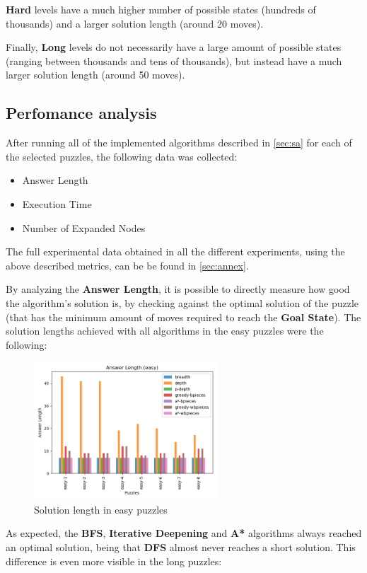 \documentclass[conference]{IEEEtran}
\begin{document}
\textbf{Hard} levels have a much higher number of possible states (hundreds of thousands) and a larger solution length (around 20 moves).

Finally, \textbf{Long} levels do not necessarily have a large amount of possible states (ranging between thousands and tens of thousands), but instead have a much larger solution length (around 50 moves).

\subsection{Perfomance analysis}

After running all of the implemented algorithms described in \autoref{sec:sa} for each of the selected puzzles, the following data was collected:

\begin{itemize}
    \item Answer Length
    \item Execution Time
    \item Number of Expanded Nodes
\end{itemize}

The full experimental data obtained in all the different experiments, using the above described metrics, can be be found in \autoref{sec:annex}.

By analyzing the \textbf{Answer Length}, it is possible to directly measure how good the algorithm's solution is, by checking against the optimal solution of the puzzle (that has the minimum amount of moves required to reach the \textbf{Goal State}). The solution lengths achieved with all algorithms in the easy puzzles were the following:

\begin{figure}[H]
    \centerline{\includegraphics[width=260px]{../../graphics/answerLength-easy.png}}
    \caption{Solution length in easy puzzles}
\end{figure}

As expected, the \textbf{BFS}, \textbf{Iterative Deepening} and \textbf{A*} algorithms always reached an optimal solution, being that \textbf{DFS} almost never reaches a short solution. This difference is even more visible in the long puzzles:
\end{document}
